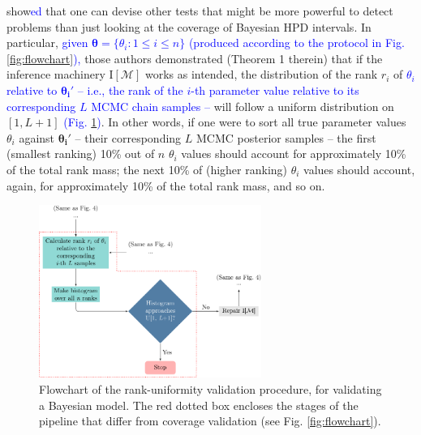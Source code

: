 \documentclass[oneside]{article}
\begin{document}
\cite{Talts2018} show\textcolor{blue}{ed} that one can devise other tests that might be more powerful to detect problems than just looking at the coverage of Bayesian HPD intervals.
In particular, \textcolor{blue}{given $\boldsymbol{\theta} =
  \{\theta_i : 1 \leq i \leq n\}$ (produced according to the protocol
  in Fig. \ref{fig:flowchart}),} those authors demonstrated (Theorem 1
therein) that if the inference machinery $\text{I}[\mathcal{M}]$ works
as intended, the distribution of the rank $r_i$ of
\textcolor{blue}{$\theta_i$ relative to $\boldsymbol{\theta_i'}$ --
  i.e., the rank of the $i$-th parameter value relative to its
  corresponding $L$ MCMC chain samples -- }
 will follow a uniform distribution on $[1, L + 1]$ \textcolor{blue}{(Fig. \ref{fig:sbcflowchart})}.
In other words, if one were to sort all true parameter values $\theta_i$ against $\boldsymbol{\theta_i'}$ -- their corresponding $L$ MCMC posterior samples -- the first (smallest ranking) 10\% out of $n$ $\theta_i$ values should account for approximately 10\% of the total rank mass; the next 10\% of (higher ranking) $\theta_i$ values should account, again, for approximately 10\% of the total rank mass, and so on.
\begin{figure}
  \includegraphics[width=7.25cm]{../figures/flowchart_sbc.pdf}
  \caption{Flowchart of the rank-uniformity validation procedure,
    for validating a Bayesian model. The red dotted box encloses the stages of the pipeline that
  differ from coverage validation (see Fig. \ref{fig:flowchart}).}
\label{fig:sbcflowchart}
\end{figure}
\end{document}
